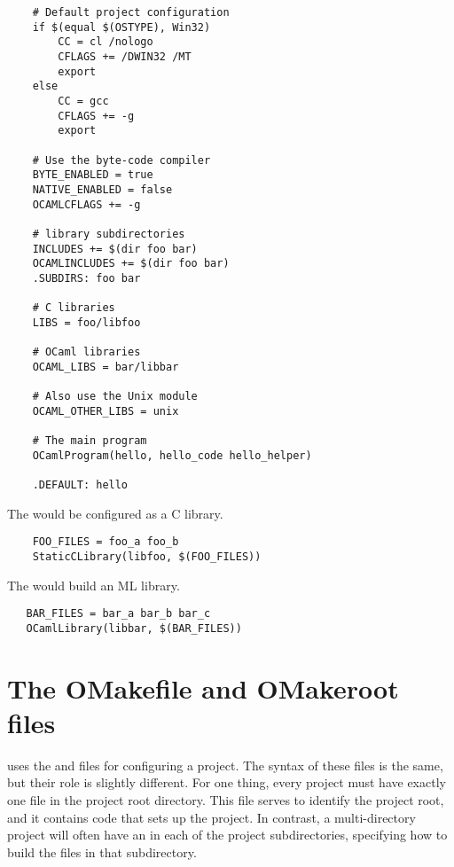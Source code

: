 \begin{verbatim}
    # Default project configuration
    if $(equal $(OSTYPE), Win32)
        CC = cl /nologo
        CFLAGS += /DWIN32 /MT
        export
    else
        CC = gcc
        CFLAGS += -g
        export

    # Use the byte-code compiler
    BYTE_ENABLED = true
    NATIVE_ENABLED = false
    OCAMLCFLAGS += -g

    # library subdirectories
    INCLUDES += $(dir foo bar)
    OCAMLINCLUDES += $(dir foo bar)
    .SUBDIRS: foo bar

    # C libraries
    LIBS = foo/libfoo

    # OCaml libraries
    OCAML_LIBS = bar/libbar

    # Also use the Unix module
    OCAML_OTHER_LIBS = unix

    # The main program
    OCamlProgram(hello, hello_code hello_helper)

    .DEFAULT: hello
\end{verbatim}

The  would be configured as a C library.

\begin{verbatim}
    FOO_FILES = foo_a foo_b
    StaticCLibrary(libfoo, $(FOO_FILES))
\end{verbatim}

The  would build an ML library.

\begin{verbatim}
   BAR_FILES = bar_a bar_b bar_c
   OCamlLibrary(libbar, $(BAR_FILES))
\end{verbatim}

\section{The OMakefile and OMakeroot files}
\label{section:omakeroot}

 uses the  and  files for configuring a project.  The
syntax of these files is the same, but their role is slightly different.  For one thing, every
project must have exactly one  file in the project root directory.  This file serves
to identify the project root, and it contains code that sets up the project.  In contrast, a
multi-directory project will often have an  in each of the project subdirectories,
specifying how to build the files in that subdirectory.

